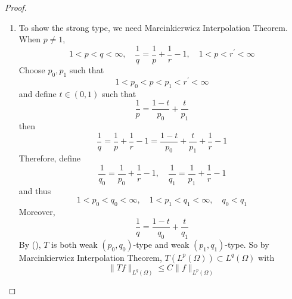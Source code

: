 \begin{proof}
\begin{enumerate}[label=(\Roman*)]
		\item To show the strong type, we need Marcinkierwicz Interpolation Theorem. When $p \neq 1$,
		\begin{equation*}
			1<p<q<\infty, \quad \frac{1}{q}=\frac{1}{p}+\frac{1}{r}-1, \quad 1<p<r^{\prime}<\infty
		\end{equation*}
		Choose $p_0,p_1$ such that
		\begin{equation*}
			1<p_0<p<p_1<r^{\prime}<\infty
		\end{equation*}
		and define $t \in (0,1)$ such that
		\begin{equation*}
			\frac{1}{p}=\frac{1-t}{p_0}+\frac{t}{p_1}
		\end{equation*}
		then
		\begin{equation*}
			\frac{1}{q}=\frac{1}{p}+\frac{1}{r}-1=\frac{1-t}{p_0}+\frac{t}{p_1}+\frac{1}{r}-1
		\end{equation*}
		Therefore, define
		\begin{equation*}
			\frac{1}{q_0}=\frac{1}{p_0}+\frac{1}{r}-1, \quad \frac{1}{q_1}=\frac{1}{p_1}+\frac{1}{r}-1
		\end{equation*}
		and thus
		\begin{equation*}
			1<p_0<q_0<\infty, \quad 1<p_1<q_1<\infty, \quad q_0<q_1
		\end{equation*}
		Moreover,
		\begin{equation*}
			\frac{1}{q}=\frac{1-t}{q_0}+\frac{t}{q_1}
		\end{equation*}
		By (), $T$ is both weak $(p_0,q_0)$-type and weak $(p_1,q_1)$-type. So by Marcinkierwicz Interpolation Theorem, $T\left(L^p(\Omega)\right) \subset L^q(\Omega)$ with
		\begin{equation*}
			\|T f\|_{L^q(\Omega)} \leq C\|f\|_{L^p(\Omega)}
		\end{equation*}
	\end{enumerate}
\end{proof}

